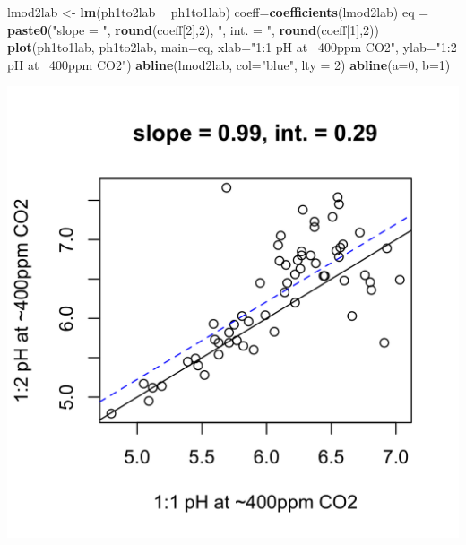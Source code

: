 \documentclass[]{article}
\newenvironment{Shaded}{\begin{snugshade}}{\end{snugshade}}
\newcommand{\DataTypeTok}[1]{\textcolor[rgb]{0.13,0.29,0.53}{#1}}
\newcommand{\DecValTok}[1]{\textcolor[rgb]{0.00,0.00,0.81}{#1}}
\newcommand{\KeywordTok}[1]{\textcolor[rgb]{0.13,0.29,0.53}{\textbf{#1}}}
\newcommand{\NormalTok}[1]{#1}
\newcommand{\OperatorTok}[1]{\textcolor[rgb]{0.81,0.36,0.00}{\textbf{#1}}}
\newcommand{\StringTok}[1]{\textcolor[rgb]{0.31,0.60,0.02}{#1}}
\begin{document}
\begin{Shaded}
\begin{Highlighting}[]
\NormalTok{lmod2lab <-}\StringTok{ }\KeywordTok{lm}\NormalTok{(ph1to2lab }\OperatorTok{~}\StringTok{ }\NormalTok{ph1to1lab)}
\NormalTok{coeff=}\KeywordTok{coefficients}\NormalTok{(lmod2lab)}
\NormalTok{eq =}\StringTok{ }\KeywordTok{paste0}\NormalTok{(}\StringTok{"slope = "}\NormalTok{, }\KeywordTok{round}\NormalTok{(coeff[}\DecValTok{2}\NormalTok{],}\DecValTok{2}\NormalTok{), }\StringTok{", int. = "}\NormalTok{, }\KeywordTok{round}\NormalTok{(coeff[}\DecValTok{1}\NormalTok{],}\DecValTok{2}\NormalTok{))}
\KeywordTok{plot}\NormalTok{(ph1to1lab, ph1to2lab, }\DataTypeTok{main=}\NormalTok{eq,}
   \DataTypeTok{xlab=}\StringTok{"1:1 pH at ~400ppm CO2"}\NormalTok{, }\DataTypeTok{ylab=}\StringTok{"1:2 pH at ~400ppm CO2"}\NormalTok{)}
\KeywordTok{abline}\NormalTok{(lmod2lab, }\DataTypeTok{col=}\StringTok{"blue"}\NormalTok{, }\DataTypeTok{lty =} \DecValTok{2}\NormalTok{)}
\KeywordTok{abline}\NormalTok{(}\DataTypeTok{a=}\DecValTok{0}\NormalTok{, }\DataTypeTok{b=}\DecValTok{1}\NormalTok{)}
\end{Highlighting}
\end{Shaded}

\includegraphics{output-rmd/whitman-figure-request-2-lab-spooner-1.png}
\end{document}
